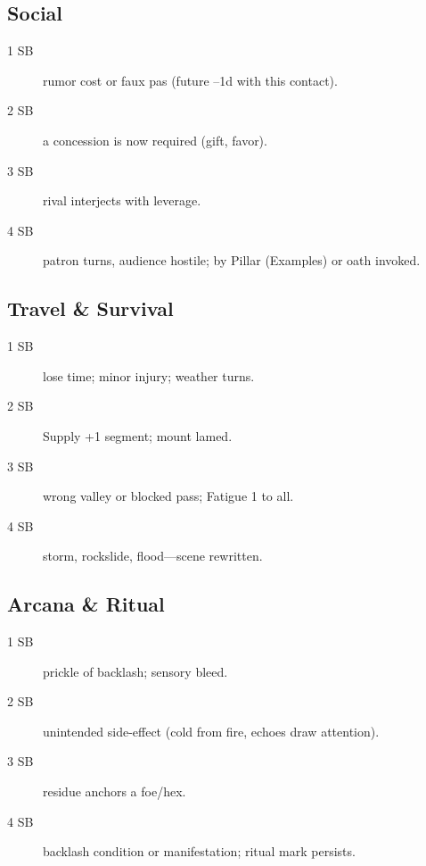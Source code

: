 \subsection{Social}

\begin{description}
\item[1 SB] rumor cost or faux pas (future --1d with this contact).
\item[2 SB] a concession is now required (gift, favor).
\item[3 SB] rival interjects with leverage.
\item[4 SB] patron turns, audience hostile; by Pillar (Examples) or oath invoked.
\end{description}

\subsection{Travel \& Survival}

\begin{description}
\item[1 SB] lose time; minor injury; weather turns.
\item[2 SB] Supply +1 segment; mount lamed.
\item[3 SB] wrong valley or blocked pass; Fatigue 1 to all.
\item[4 SB] storm, rockslide, flood---scene rewritten.
\end{description}

\subsection{Arcana \& Ritual}

\begin{description}
\item[1 SB] prickle of backlash; sensory bleed.
\item[2 SB] unintended side-effect (cold from fire, echoes draw attention).
\item[3 SB] residue anchors a foe/hex.
\item[4 SB] backlash condition or manifestation; ritual mark persists.
\end{description}

